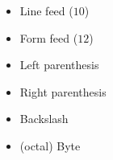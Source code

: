 \documentclass{article}
\begin{document}
\begin{itemize}\def\makelabel#1{\hss\llap{\ttfamily\string#1}}
  \item[\n] Line feed ($10$)
  \item[\f] Form feed ($12$)
  \item[\(] Left parenthesis
  \item[\)] Right parenthesis
  \item[\\] Backslash
  \item[\ddd] (octal) Byte
\end{itemize}
\end{document}
